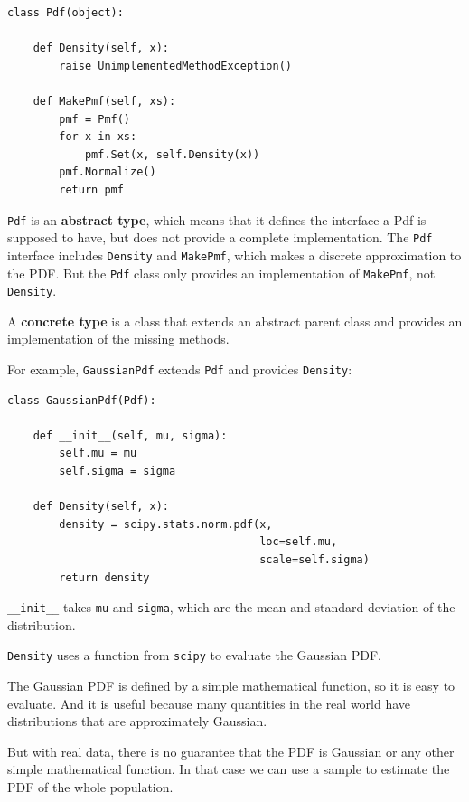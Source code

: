 \documentclass[12pt]{book}
\begin{document}
\begin{verbatim}
class Pdf(object):

    def Density(self, x):
        raise UnimplementedMethodException()

    def MakePmf(self, xs):
        pmf = Pmf()
        for x in xs:
            pmf.Set(x, self.Density(x))
        pmf.Normalize()
        return pmf
\end{verbatim}

{\tt Pdf} is an {\bf abstract type}, which means that it defines
the interface a Pdf is supposed to have, but does not provide
a complete implementation.  The {\tt Pdf} interface includes
{\tt Density} and
{\tt MakePmf}, which makes a discrete approximation to the
PDF.  But the {\tt Pdf} class only provides an implementation
of {\tt MakePmf}, not {\tt Density}.

A {\bf concrete type} is a class that extends an abstract parent
class and provides an implementation of the missing methods.

For example, {\tt GaussianPdf} extends {\tt Pdf} and provides
{\tt Density}:

\begin{verbatim}
class GaussianPdf(Pdf):

    def __init__(self, mu, sigma):
        self.mu = mu
        self.sigma = sigma
        
    def Density(self, x):
        density = scipy.stats.norm.pdf(x, 
                                       loc=self.mu, 
                                       scale=self.sigma)
        return density
\end{verbatim}

\verb"__init__" takes {\tt mu} and {\tt sigma}, which are
the mean and standard deviation of the distribution.

{\tt Density} uses a function from {\tt scipy} to evaluate the
Gaussian PDF.

The Gaussian PDF is defined by a simple mathematical function,
so it is easy to evaluate.  And it is useful because many
quantities in the real world have distributions that are
approximately Gaussian.

But with real data, there is no guarantee that the PDF
is Gaussian or any other simple mathematical function.  In
that case we can use a sample to estimate the PDF of
the whole population.
\end{document}
